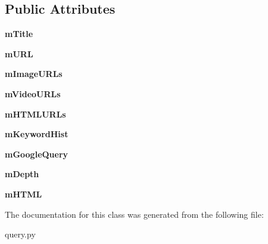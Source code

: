 \subsection*{Public Attributes}
\begin{DoxyCompactItemize}
\item 
\hypertarget{classquery_1_1Query_a3067f8805d7e11ba99dd6c8b47387460}{{\bfseries m\-Title}}\label{classquery_1_1Query_a3067f8805d7e11ba99dd6c8b47387460}

\item 
\hypertarget{classquery_1_1Query_af9e17a3a3f5284c0f2eedd8b4f1758da}{{\bfseries m\-U\-R\-L}}\label{classquery_1_1Query_af9e17a3a3f5284c0f2eedd8b4f1758da}

\item 
\hypertarget{classquery_1_1Query_a29cc3b88d60442b84745e21a8a1cd504}{{\bfseries m\-Image\-U\-R\-Ls}}\label{classquery_1_1Query_a29cc3b88d60442b84745e21a8a1cd504}

\item 
\hypertarget{classquery_1_1Query_a8d685c4ef0df5faafaec1b1284f00c38}{{\bfseries m\-Video\-U\-R\-Ls}}\label{classquery_1_1Query_a8d685c4ef0df5faafaec1b1284f00c38}

\item 
\hypertarget{classquery_1_1Query_af6497f231f86376ecb130d2c3248c38b}{{\bfseries m\-H\-T\-M\-L\-U\-R\-Ls}}\label{classquery_1_1Query_af6497f231f86376ecb130d2c3248c38b}

\item 
\hypertarget{classquery_1_1Query_a9b1607519ffb10c67a2f68b747853d87}{{\bfseries m\-Keyword\-Hist}}\label{classquery_1_1Query_a9b1607519ffb10c67a2f68b747853d87}

\item 
\hypertarget{classquery_1_1Query_a827264b4b6ded1a8b6b1d917d3daed5e}{{\bfseries m\-Google\-Query}}\label{classquery_1_1Query_a827264b4b6ded1a8b6b1d917d3daed5e}

\item 
\hypertarget{classquery_1_1Query_a8b312c607fd79c3ddd3968cb44cd59cd}{{\bfseries m\-Depth}}\label{classquery_1_1Query_a8b312c607fd79c3ddd3968cb44cd59cd}

\item 
\hypertarget{classquery_1_1Query_adbd462b8bd021032a8d19439e5eb52d5}{{\bfseries m\-H\-T\-M\-L}}\label{classquery_1_1Query_adbd462b8bd021032a8d19439e5eb52d5}

\end{DoxyCompactItemize}


The documentation for this class was generated from the following file\-:\begin{DoxyCompactItemize}
\item 
query.\-py\end{DoxyCompactItemize}
